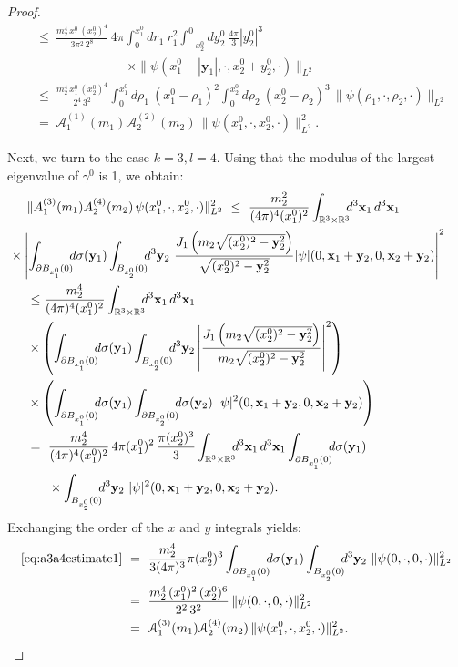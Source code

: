 \documentclass[b5paper,draft,openbib,12pt]{memoir}
\newcommand{\R}{\mathbb{R}}
\newcommand{\vx}{\mathbf{x}}
\newcommand{\vy}{\mathbf{y}}
\begin{document}
\begin{proof}
\begin{align}
&\leq~  \frac{m_2^4 \, x_1^0\,  (x_2^0)^4}{3 \pi^2\, 2^8 } \, 4\pi \int_{0}^{x_1^0} \!\!\! d r_1 ~r_1^2 \int_{-x_2^0}^0 dy_2^0 ~\frac{4\pi}{3} |y_2^0|^3 \\\nonumber
&\hspace{3cm}\times \| \psi(x_1^0 - |\vy_1|,\cdot,x_2^0 + y_2^0,\cdot)\|_{L^2} \nonumber\\
&\leq~  \frac{m_2^4 \, x_1^0 \,  (x_2^0)^4}{2^4 \, 3^2} \int_{0}^{x_1^0} \!\!\! d \rho_1 ~(x_1^0-\rho_1)^2 \int_{0}^{x_2^0} d\rho_2 ~(x_2^0-\rho_2)^3 \, \| \psi(\rho_1,\cdot,\rho_2,\cdot)\|_{L^2} \nonumber\\
&=~ \mathcal{A}_1^{(1)}(m_1) \mathcal{A}_2^{(2)}(m_2)\, \|\psi(x_1^0,\cdot,x_2^0,\cdot)\|^2_{L^2}.
\end{align}

Next, we turn to the case $k=3, l=4$. Using that the modulus of the 
largest eigenvalue of $\gamma^0$ is 1, we obtain:
\begin{align}
	&\| A_1^{(3)}(m_1) A_2^{(4)}(m_2)\, \psi(x^0_1,\cdot,x_2^0,\cdot) \|^2_{L^2} ~\leq~ \frac{m_2^2}{(4\pi)^4 (x_1^0)^2} \int_{\R^3\times \R^3} \!\!\! d^3 \vx_1 \, d^3 \vx_1\nonumber\\
 &\hspace{-0.5cm}\times \left|\int_{\partial B_{x_1^0}(0)} \!\!\! d \sigma(\vy_1) \int_{B_{x_2^0}(0)} \!\!\! d^3 \vy_2 ~\frac{J_1\left( m_2\sqrt{(x_2^0)^2-\vy_2^2}\right)}{\sqrt{(x_2^0)^2-\vy_2^2}} |\psi|(0,\vx_1+\vy_2,0,\vx_2+\vy_2) \right|^2\nonumber\\
&\leq \frac{m_2^4}{(4\pi)^4 (x_1^0)^2} \int_{\R^3\times \R^3} \!\!\! d^3 \vx_1 \, d^3 \vx_1\nonumber\\
& \times\left(\int_{\partial B_{x_1^0}(0)} \!\!\! d \sigma(\vy_1) \int_{B_{x_2^0}(0)} \!\!\! d^3 \vy_2 \left|\frac{J_1\left( m_2\sqrt{(x_2^0)^2-\vy_2^2}\right)}{m_2\sqrt{(x_2^0)^2-\vy_2^2}}\right|^2 \right)\nonumber\\
& \times \left( \int_{\partial B_{x_1^0}(0)} \!\!\! d \sigma(\vy_1) \int_{\partial B_{x_2^0}(0)} \!\!\! d \sigma(\vy_2) ~|\psi|^2(0,\vx_1+\vy_2,0,\vx_2+\vy_2)\right)\nonumber\\
&=~ \frac{m_2^4}{(4\pi)^4 (x_1^0)^2} \, 4\pi (x_1^0)^2 \, \frac{\pi (x_2^0)^3}{3} \int_{\R^3\times \R^3} \!\!\! d^3 \vx_1 \, d^3 \vx_1 \int_{\partial B_{x_1^0}(0)} \!\!\! d \sigma(\vy_1)  \nonumber\\
&~~~~~\times\int_{B_{x_2^0}(0)} \!\!\! d^3 \vy_2 ~|\psi|^2(0,\vx_1+\vy_2,0,\vx_2+\vy_2).
\label{eq:a3a4estimate1}
\end{align}
Exchanging the order of the $x$ and $y$ integrals yields:
\begin{align}
	\eqref{eq:a3a4estimate1} ~&=~ \frac{m_2^4}{3 (4\pi)^3} \pi (x_2^0)^3\int_{\partial B_{x_1^0}(0)} \!\!\! d \sigma(\vy_1) \int_{B_{x_2^0}(0)} \!\!\! d^3 \vy_2 ~\|\psi(0,\cdot,0,\cdot)\|^2_{L^2}\nonumber\\
&=~ \frac{m_2^4 \, (x_1^0)^2 \, (x_2^0)^6}{2^2 \, 3^2} \, \|\psi(0,\cdot,0,\cdot)\|^2_{L^2}\nonumber\\
&= ~ \mathcal{A}_1^{(3)}(m_1) \mathcal{A}_2^{(4)}(m_2) \,  \|\psi(x_1^0,\cdot,x_2^0,\cdot)\|^2_{L^2}.
\end{align} 
\end{proof}
\end{document}
